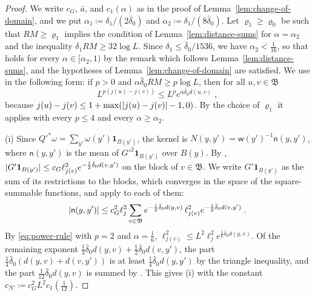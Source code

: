 \documentclass[11pt]{preprint}
\DeclarePairedDelimiter{\abs}{\lvert}{\rvert}
\numberwithin{equation}{section}
\theoremstyle{definition}
\theoremstyle{remark}
\theoremstyle{plain}
\begin{document}
\begin{proof}
We write $c_G$, $\bar a$, and $c_1(\alpha)$ as in the proof of Lemma~\ref{lem:change-of-domain}, and we put $\alpha_1 \coloneqq \delta_1/(2\bar\delta_0)$ and $\alpha_2 \coloneqq \delta_1/(8\bar\delta_0)$. Let $\varrho_1 \geq \varrho_0$ be such that $RM \geq \varrho_1$ implies the condition of Lemma~\ref{lem:distance-sums} for $\alpha = \alpha_2$ and the inequality $\delta_1RM \geq 32\log L$. Since $\delta_1 \leq \bar\delta_0/1536$, we have $\alpha_2 < \frac{1}{16}$, so that \cite[(2.61)]{BalabanPRT2} holds for every $\alpha \in [\alpha_2, 1)$ by the remark which follows Lemma~\ref{lem:distance-sums}, and the hypotheses of Lemma~\ref{lem:change-of-domain} are satisfied. We use \cite[(2.60)]{BalabanPRT2} in the following form: if $p > 0$ and $\alpha\bar\delta_0RM \geq p\log L$, then for all $u, v \in \mathfrak B$
\begin{equation}\label{eq:power-rule}
    L^{p(j(u) - j(v))} \leq L^pe^{\alpha\bar\delta_0d(u, v)}\;,
\end{equation}
because $j(u) - j(v) \leq 1 + \max(\abs{j(u) - j(v)} - 1, 0)$. By the choice of $\varrho_1$ it applies with every $p \leq 4$ and every $\alpha \geq \alpha_2$.

(i) Since $Q'^*\omega = \sum_{y'}\omega(y')\mathbf 1_{B(y')}$, the kernel is $N(y, y') = \mathsf w(y')^{-1}\mathsf n(y, y')$, where $\mathsf n(y, y')$ is the mean of $G'^2\mathbf 1_{B(y')}$ over $B(y)$. By \cite[(2.67)]{BalabanPRT2}, $\abs{G'\mathbf 1_{B(y')}} \leq c_G\ell_{j(v)}^2e^{-\frac12\bar\delta_0d(v, y')}$ on the block of $v \in \mathfrak B$. We write $G'\mathbf 1_{B(y')}$ as the sum of its restrictions to the blocks, which converges in the space of the square-summable functions, and apply \cite[(2.67)]{BalabanPRT2} to each of them:
\begin{equation}\label{eq:square-kernel}
    \abs{\mathsf n(y, y')} \leq c_G^2\ell_j^2\sum_{v \in \mathfrak B}e^{-\frac12\bar\delta_0d(y, v)}\,\ell_{j(v)}^2e^{-\frac12\bar\delta_0d(v, y')}\;.
\end{equation}
By \eqref{eq:power-rule} with $p = 2$ and $\alpha = \frac16$, $\ell_{j(v)}^2 \leq L^2\ell_j^2e^{\frac16\bar\delta_0d(y, v)}$. Of the remaining exponent $\frac13\bar\delta_0d(y, v) + \frac12\bar\delta_0d(v, y')$, the part $\frac14\bar\delta_0(d(y, v) + d(v, y'))$ is at least $\frac14\bar\delta_0d(y, y')$ by the triangle inequality, and the part $\frac{1}{12}\bar\delta_0d(y, v)$ is summed by \cite[(2.61)]{BalabanPRT2}. This gives (i) with the constant $c_{N'} \coloneqq c_G^2L^2c_1(\frac{1}{12})$.


\end{proof}
\end{document}
